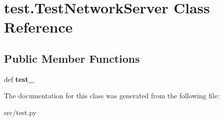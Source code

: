\hypertarget{classtest_1_1_test_network_server}{\section{test.\-Test\-Network\-Server \-Class \-Reference}
\label{classtest_1_1_test_network_server}
}
\subsection*{\-Public \-Member \-Functions}
\begin{DoxyCompactItemize}
\item 
\hypertarget{classtest_1_1_test_network_server_a391ecf52930ae668e5e3b7d78ccf9324}{def {\bfseries test\-\_\-}}\label{classtest_1_1_test_network_server_a391ecf52930ae668e5e3b7d78ccf9324}

\end{DoxyCompactItemize}


\-The documentation for this class was generated from the following file\-:\begin{DoxyCompactItemize}
\item 
src/test.\-py\end{DoxyCompactItemize}
